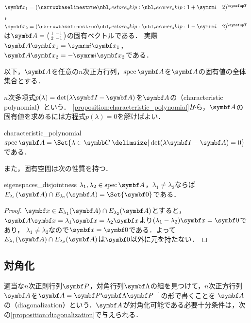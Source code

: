 \documentclass[../../main]{subfiles}
\begin{document}
\begin{example}
  \(\vect{x}_1=\trps{\rowvect{1+\iuni & 2}}\)，\(\vect{x}_2=\trps{\rowvect{1-\iuni & 2}}\)は\(\mat{A}=\smallmatrice{1 & -1 \\ 2 & -1}\)の固有ベクトルである．
  実際\(\mat{A}\vect{x}_1=\iuni\vect{x}_1\)，\(\mat{A}\vect{x}_2=-\iuni\vect{x}_2\)である．
\end{example}

以下，\(\mat{A}\)を任意の\(n\)次正方行列，\(\spec\mat{A}\)を\(\mat{A}\)の固有値の全体集合とする．

\(n\)次多項式\(p(\lambda)=\det(\lambda\imat-\mat{A})\)を\(\mat{A}\)の（characteristic polynomial）という．
\cref{proposition:characteristic_polynomial}から，\(\mat{A}\)の固有値を求めるには方程式\(p(\lambda)=0\)を解けばよい．

\begin{proposition}{}{characteristic_polynomial}
  \(\spec\mat{A}=\Set{\lambda\in\numset{C}\given\det(\lambda\imat-\mat{A})=0}\)である．
\end{proposition}

また，固有空間は次の性質を持つ．

\begin{proposition}{}{eigenspaces_disjointness}
  \(\lambda_1,\lambda_2\in\spec\mat{A}\)，\(\lambda_1\neq\lambda_2\)ならば\(E_{\lambda_1}(\mat{A})\cap E_{\lambda_2}(\mat{A})=\Set{\zvec}\)である．
\end{proposition}

\begin{proof}
  \(\vect{x}\in E_{\lambda_1}(\mat{A})\cap E_{\lambda_2}(\mat{A})\)とすると，\(\mat{A}\vect{x}=\lambda_1\vect{x}=\lambda_2\vect{x}\)より\((\lambda_1-\lambda_2)\vect{x}=\zvec\)であり，
  \(\lambda_1\neq\lambda_2\)なので\(\vect{x}=\zvec\)である．よって\(E_{\lambda_1}(\mat{A})\cap E_{\lambda_2}(\mat{A})\)は\(\zvec\)以外に元を持たない．
\end{proof}

\subsection{対角化}

適当な\(n\)次正則行列\(\mat{P}\)，対角行列\(\mat{\Lambda}\)の組を見つけて，\(n\)次正方行列\(\mat{A}\)を\(\mat{A}=\mat{P}\mat{\Lambda}\mat{P}^{-1}\)の形で書くことを
\(\mat{A}\)の（diagonalization）という．\(\mat{A}\)が対角化可能である必要十分条件は，次の\cref{proposition:diagonalization}で与えられる．
\end{document}

